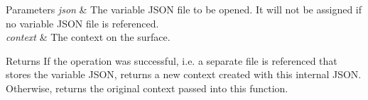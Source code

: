 \begin{DoxyParams}{Parameters}
{\em json} & The variable J\+S\+ON file to be opened. It will not be assigned if no variable J\+S\+ON file is referenced. \\
\hline
{\em context} & The context on the surface. \\
\hline
\end{DoxyParams}
\begin{DoxyReturn}{Returns}
If the operation was successful, i.\+e. a separate file is referenced that stores the variable J\+S\+ON, returns a new context created with this internal J\+S\+ON. Otherwise, returns the original context passed into this function. 
\end{DoxyReturn}
